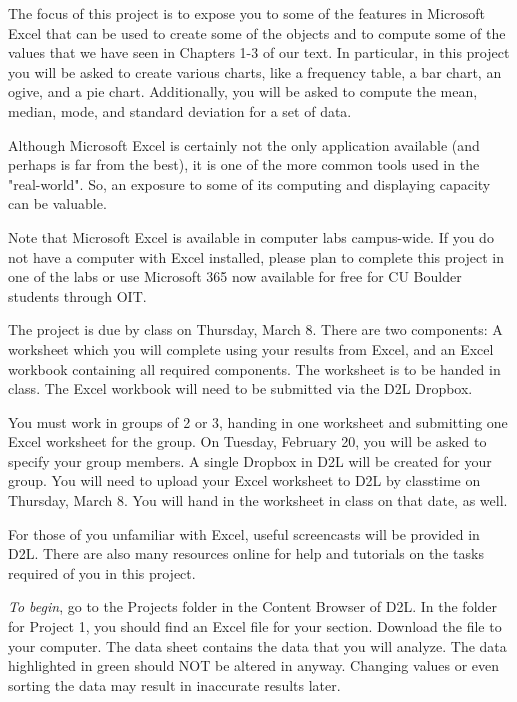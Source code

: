 \documentclass{article}
\begin{document}
\pagestyle{myheadings}

\begin{center}
\textbf{}
\end{center}

The focus of this project is to expose you to some of the features in Microsoft Excel that can be used to create some of the objects and to compute some of the values that we have seen in Chapters 1-3 of our text. In particular, in this project you will be asked to create various charts, like a frequency table, a bar chart, an ogive, and a pie chart. Additionally, you will be asked to compute the mean, median, mode, and standard deviation for a set of data.

Although Microsoft Excel is certainly not the only application available (and perhaps is far from the best), it is one of the more common tools used in the "real-world". So, an exposure to some of its computing and displaying capacity can be valuable.

Note that Microsoft Excel is available in computer labs campus-wide. If you do not have a computer with Excel installed, please plan to complete this project in one of the labs or use Microsoft 365 now available for free for CU Boulder students through OIT. 

The project is due by class on Thursday, March 8. There are two components: A worksheet which you will complete using your results from Excel, and an Excel workbook containing all required components. The worksheet is to be handed in class. The Excel workbook will need to be submitted via the D2L Dropbox.

You must work in groups of 2 or 3, handing in one worksheet and submitting one Excel worksheet for the group. On Tuesday, February 20, you will be asked to specify your group members. A single Dropbox in D2L will be created for your group. You will need to upload your Excel worksheet to D2L by classtime on Thursday, March 8. You will hand in the worksheet in class on that date, as well.

For those of you unfamiliar with Excel, useful screencasts will be provided in D2L. There are also many resources online for help and tutorials on the tasks required of you in this project.

{\em To begin}, go to the Projects folder in the Content Browser of D2L. In the folder for Project 1, you should find an Excel file for your section. Download the file to your computer. The data sheet contains the data that you will analyze. The data highlighted in green should NOT be altered in anyway. Changing values or even sorting the data may result in inaccurate results later. 
\end{document}
